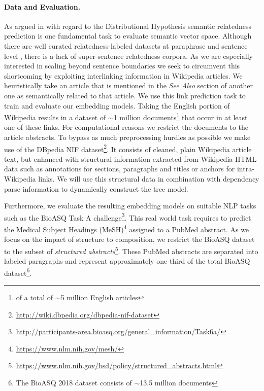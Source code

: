 
\paragraph{Data and Evaluation.}As argued in \textcite{binder_comparison_2018} with regard to the Distributional Hypothesis \autocite{harris_distributional_1954} semantic relatedness \autocite{resnik_semantic_1999, budanitsky_evaluating_2006} prediction is one fundamental task to evaluate semantic vector space. Although there are well curated relatedness-labeled datasets at paraphrase and sentence level \autocite{pavlick_ppdb_2015, dolan_automatically_2005, marelli_sick_2014,cer_semeval-2017_2017}, there is a lack of super-sentence relatedness corpora. As we are especially interested in scaling beyond sentence boundaries %
we seek to circumvent this shortcoming by exploiting interlinking information in Wikipedia articles. We heuristically take an article that is mentioned in the \textit{See Also} %
section of another one as semantically related to that article. We use this link prediction task to train and evaluate our embedding models. Taking the English portion of Wikipedia results in a dataset of $\sim$1 million documents\footnote{of a total of $\sim$5 million English articles} that occur in at least one of these links. For computational reasons we restrict the documents to the article abstracts. To bypass as much preprocessing hurdles as possible we make use of the DBpedia NIF \autocite{dojchinovski_dbpedia_2018} dataset\footnote{\url{http://wiki.dbpedia.org/dbpedia-nif-dataset}}. It consists of cleaned, plain Wikipedia article text, but enhanced with structural information extracted from Wikipedia HTML data such as annotations for sections, paragraphs and titles or anchors for intra-Wikipedia links. We will use this structural data in combination with dependency parse information to dynamically construct the tree model.

Furthermore, we evaluate the resulting embedding models on suitable \ac{NLP} tasks such as the BioASQ Task A challenge\footnote{\url{http://participants-area.bioasq.org/general_information/Task6a/}}. This real world task requires to predict the Medical Subject Headings (MeSH)\footnote{\url{https://www.nlm.nih.gov/mesh/}} assigned to a PubMed abstract. As we focus on the impact of structure to composition, we restrict the BioASQ dataset to the subset of \textit{structured abstracts}\footnote{\url{https://www.nlm.nih.gov/bsd/policy/structured_abstracts.html}}. These PubMed abstracts are separated into labeled paragraphs and represent approximately one third of the total BioASQ dataset\footnote{The BioASQ 2018 dataset consists of $\sim$13.5 million documents}. %

